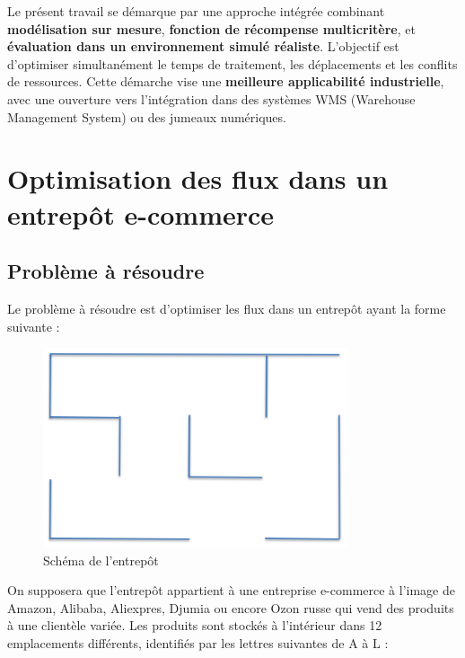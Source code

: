 \documentclass{article}
\begin{document}
Le présent travail se démarque par une approche intégrée combinant \textbf{modélisation sur mesure}, \textbf{fonction de récompense multicritère}, et \textbf{évaluation dans un environnement simulé réaliste}. L'objectif est d'optimiser simultanément le temps de traitement, les déplacements et les conflits de ressources. Cette démarche vise une \textbf{meilleure applicabilité industrielle}, avec une ouverture vers l'intégration dans des systèmes WMS (Warehouse Management System) ou des jumeaux numériques.

\section{Optimisation des flux dans un entrepôt e-commerce}
\subsection{Problème à résoudre}
Le problème à résoudre est d'optimiser les flux dans un entrepôt ayant la forme suivante :

\begin{figure}[h]
    \centering
    \includegraphics[width=0.8\textwidth]{image1.png} 
    \caption{Schéma de l'entrepôt}
    \label{fig:Schéma de l'entrepôt}
\end{figure}


On supposera que l'entrepôt appartient à une entreprise e-commerce à l'image de Amazon, Alibaba, Aliexpres, Djumia ou encore Ozon russe qui vend des produits à une clientèle variée. Les produits sont stockés à l'intérieur dans 12 emplacements différents, identifiés par les lettres suivantes de A à L :
\end{document}
